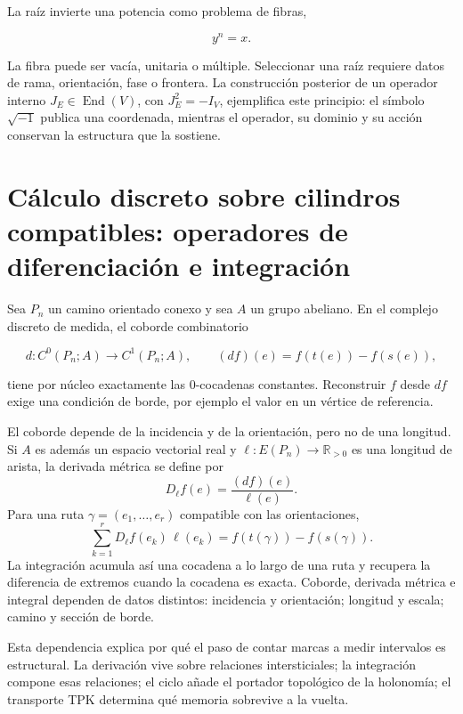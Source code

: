 La raíz invierte una potencia como problema de fibras,

\[
 y^n=x.
\]

La fibra puede ser vacía, unitaria o múltiple. Seleccionar una raíz requiere
datos de rama, orientación, fase o frontera. La construcción posterior de un
operador interno \(J_E\in\operatorname{End}(V)\), con \(J_E^2=-I_V\),
ejemplifica este principio: el
símbolo \(\sqrt{-1}\) publica una coordenada, mientras el operador, su dominio
y su acción conservan la estructura que la sostiene.

\section{Cálculo discreto sobre cilindros compatibles: operadores de diferenciación e integración}

Sea \(P_n\) un camino orientado conexo y sea \(A\) un grupo abeliano. En el
complejo discreto de medida, el coborde combinatorio

\[
 d:C^0(P_n;A)\longrightarrow C^1(P_n;A),
 \qquad (df)(e)=f(t(e))-f(s(e)),
\]

tiene por núcleo exactamente las \(0\)-cocadenas constantes. Reconstruir
\(f\) desde \(df\) exige una condición de borde, por ejemplo el valor en un
vértice de referencia.

El coborde depende de la incidencia y de la orientación, pero no de una
longitud. Si \(A\) es además un espacio vectorial real y
\(\ell:E(P_n)\to\mathbb R_{>0}\) es una longitud de arista, la derivada
métrica se define por
\[
 D_\ell f(e)=\frac{(df)(e)}{\ell(e)}.
\]
Para una ruta \(\gamma=(e_1,\ldots,e_r)\) compatible con las orientaciones,
\begin{equation}
 \sum_{k=1}^r D_\ell f(e_k)\,\ell(e_k)
 =f(t(\gamma))-f(s(\gamma)).
 \label{eq:integracion-derivada-metrica-rev2}
\end{equation}
La integración acumula así una cocadena a lo largo de una ruta y recupera la
diferencia de extremos cuando la cocadena es exacta. Coborde, derivada métrica
e integral dependen de datos distintos: incidencia y orientación; longitud y
escala; camino y sección de borde.

Esta dependencia explica por qué el paso de contar marcas a medir intervalos
es estructural. La derivación vive sobre relaciones intersticiales; la
integración compone esas relaciones; el ciclo añade el portador topológico de
la holonomía; el transporte TPK determina qué memoria sobrevive a la vuelta.

